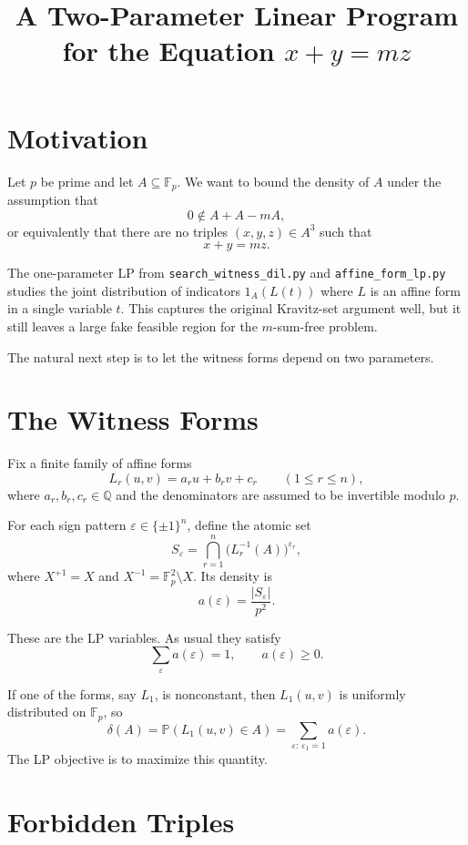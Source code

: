 \documentclass[11pt]{article}
\title{A Two-Parameter Linear Program for the Equation $x+y=mz$}
\author{}
\date{}
\begin{document}
\maketitle

\section{Motivation}

Let $p$ be prime and let $A \subseteq \mathbb{F}_p$. We want to bound the density of $A$
under the assumption that
\[
0 \notin A + A - mA,
\]
or equivalently that there are no triples $(x,y,z) \in A^3$ such that
\[
x+y=mz.
\]

The one-parameter LP from \texttt{search\_witness\_dil.py} and
\texttt{affine\_form\_lp.py} studies the joint distribution of indicators
$1_A(L(t))$ where $L$ is an affine form in a single variable $t$. This captures
the original Kravitz-set argument well, but it still leaves a large fake feasible
region for the $m$-sum-free problem.

The natural next step is to let the witness forms depend on two parameters.

\section{The Witness Forms}

Fix a finite family of affine forms
\[
L_r(u,v)=a_r u + b_r v + c_r \qquad (1 \le r \le n),
\]
where $a_r,b_r,c_r \in \mathbb{Q}$ and the denominators are assumed to be
invertible modulo $p$.

For each sign pattern $\varepsilon \in \{\pm 1\}^n$, define the atomic set
\[
S_{\varepsilon}
=
\bigcap_{r=1}^n \bigl( L_r^{-1}(A) \bigr)^{\varepsilon_r},
\]
where $X^{+1}=X$ and $X^{-1}=\mathbb{F}_p^2 \setminus X$.
Its density is
\[
a(\varepsilon)=\frac{|S_{\varepsilon}|}{p^2}.
\]

These are the LP variables. As usual they satisfy
\[
\sum_{\varepsilon} a(\varepsilon)=1,
\qquad
a(\varepsilon)\geq 0.
\]

If one of the forms, say $L_1$, is nonconstant, then $L_1(u,v)$ is uniformly
distributed on $\mathbb{F}_p$, so
\[
\delta(A)=\mathbb{P}(L_1(u,v)\in A)
=
\sum_{\varepsilon:\,\varepsilon_1=1} a(\varepsilon).
\]
The LP objective is to maximize this quantity.

\section{Forbidden Triples}
\end{document}
